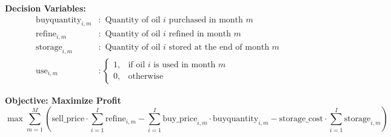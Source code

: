 \documentclass{article}
\begin{document}
\textbf{Decision Variables:}
\begin{align*}
\text{buyquantity}_{i,m} & : \text{ Quantity of oil } i \text{ purchased in month } m \\
\text{refine}_{i,m} & : \text{ Quantity of oil } i \text{ refined in month } m \\
\text{storage}_{i,m} & : \text{ Quantity of oil } i \text{ stored at the end of month } m \\
\text{use}_{i,m} & : \begin{cases} 
1, & \text{if oil } i \text{ is used in month } m \\ 
0, & \text{otherwise} 
\end{cases}
\end{align*}

\textbf{Objective: Maximize Profit}
\[
\max \sum_{m=1}^{M} \left( \text{sell\_price} \cdot \sum_{i=1}^{I} \text{refine}_{i,m} - \sum_{i=1}^{I} \text{buy\_price}_{i,m} \cdot \text{buyquantity}_{i,m} - \text{storage\_cost} \cdot \sum_{i=1}^{I} \text{storage}_{i,m} \right)
\]
\end{document}
